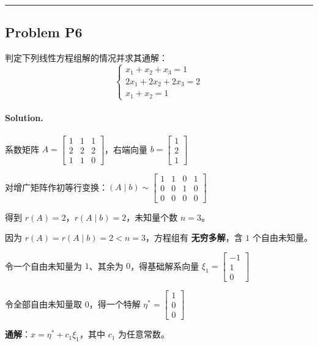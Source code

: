\documentclass[12pt, a4paper]{article}
\newcommand{\problem}[1]{\subsection*{Problem #1}}
\newcommand{\solution}{\paragraph{Solution.}}
\begin{document}

\vspace{1em}
\hrule
\vspace{1em}

\problem{P6}

判定下列线性方程组解的情况并求其通解：
   $$\begin{cases}
   x_1 + x_2 + x_3 = 1 \\
   2x_1 + 2x_2 + 2x_3 = 2 \\
   x_1 + x_2 = 1
   \end{cases}$$

\solution


系数矩阵 $A = \left[\begin{matrix}1 & 1 & 1\\2 & 2 & 2\\1 & 1 & 0\end{matrix}\right]$，右端向量 $b = \left[\begin{matrix}1\\2\\1\end{matrix}\right]$

对增广矩阵作初等行变换：$(A\mid b) \sim \left[\begin{matrix}1 & 1 & 0 & 1\\0 & 0 & 1 & 0\\0 & 0 & 0 & 0\end{matrix}\right]$

得到 $r(A) = 2$，$r(A\mid b) = 2$，未知量个数 $n = 3$。

因为 $r(A) = r(A\mid b) = 2 < n = 3$，方程组有 \textbf{无穷多解}，含 $1$ 个自由未知量。

令一个自由未知量为 $1$、其余为 $0$，得基础解系向量 $\xi_{1} = \left[\begin{matrix}-1\\1\\0\end{matrix}\right]$

令全部自由未知量取 $0$，得一个特解 $\eta^{*} = \left[\begin{matrix}1\\0\\0\end{matrix}\right]$

\textbf{通解}：$x = \eta^{*} + c_{1}\xi_{1}$，其中 $c_1$ 为任意常数。
\end{document}
